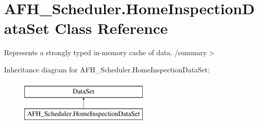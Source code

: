 \section{A\+F\+H\+\_\+\+Scheduler.\+Home\+Inspection\+Data\+Set Class Reference}
\label{class_a_f_h___scheduler_1_1_home_inspection_data_set}


Represents a strongly typed in-\/memory cache of data. /summary$>$  


Inheritance diagram for A\+F\+H\+\_\+\+Scheduler.\+Home\+Inspection\+Data\+Set\+:\begin{figure}[H]
\begin{center}
\leavevmode
\includegraphics[height=2.000000cm]{class_a_f_h___scheduler_1_1_home_inspection_data_set}
\end{center}
\end{figure}
